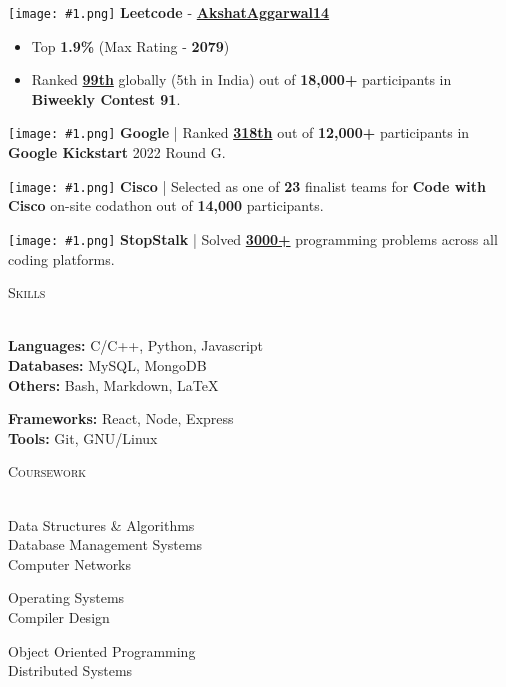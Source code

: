 \documentclass[a4paper]{article}
\newcommand{\tinyBulletSep} { \vspace{1.2mm} }
\newcommand{\sectionSep} { \vspace{3mm} }
\newcommand{\lineunder} {
    \vspace*{-8pt} \\
    \hspace*{-15pt} \hrulefill \\
}
\newcommand{\header} [1] {
    {\hspace*{-18pt}\vspace*{6pt} {
        \fontfamily{qcs}\selectfont \large \scshape #1
    }}
    \vspace*{-6pt} \lineunder
    \vspace{0.5mm}
}
\newcommand{\image}[1]{
    \begingroup\normalfont
    \Large
    \texttt{[image: \#1.png]}%
    \endgroup
}
\begin{document}
\image{lc} \textbf{Leetcode} - \textbf{\href{https://leetcode.com/AkshatAggarwal14/}{AkshatAggarwal14}}
\begin{itemize}
    \item Top \textbf{1.9\%} (Max Rating - \textbf{2079})
    \item Ranked \textbf{\href{https://clist.by/standings/biweekly-contest-91-38396296/?country=IN}{99th}} globally (5th in India) out of \textbf{18,000+} participants in \textbf{Biweekly Contest 91}.
\end{itemize}
\tinyBulletSep

\image{google} \textbf{Google} | Ranked \textbf{\href{https://drive.google.com/file/d/1cAIdPLOMWYXWl6qaP8iQeVJv8y2TtfIG/view}{318th}} out of \textbf{12,000+} participants in \textbf{Google Kickstart} 2022 Round G.
\tinyBulletSep

\image{cisco} \textbf{Cisco} | Selected as one of \textbf{23} finalist teams for \textbf{Code with Cisco} on-site codathon out of \textbf{14,000} participants.
\tinyBulletSep

\image{stopstalk} \textbf{StopStalk} | Solved \textbf{\href{https://www.stopstalk.com/user/profile/master_mind14}{3000+}} programming problems across all coding platforms.
\sectionSep


\header{Skills}
\begin{minipage}[t]{0.6\textwidth}
    \textbf{Languages:} C/C++, Python, Javascript\\
    \textbf{Databases:} MySQL, MongoDB\\
    \textbf{Others:} Bash, Markdown, \LaTeX
\end{minipage}
\hfill
\begin{minipage}[t]{0.33\textwidth}
    \textbf{Frameworks:} React, Node, Express\\
    \textbf{Tools:} Git, GNU/Linux
\end{minipage}
\sectionSep

\header{Coursework}
\begin{minipage}[t]{0.4\textwidth}
    Data Structures \& Algorithms\\
    Database Management Systems\\
    Computer Networks
\end{minipage}
\hfill
\begin{minipage}[t]{0.25\textwidth}
    Operating Systems\\
    Compiler Design
\end{minipage}
\hfill
\begin{minipage}[t]{0.3\textwidth}
    Object Oriented Programming\\
    Distributed Systems
\end{minipage}
\hfill
\sectionSep
\end{document}

